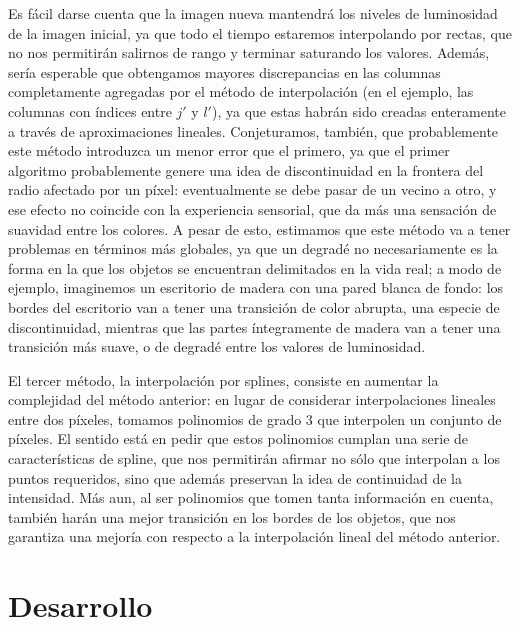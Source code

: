 \documentclass{article}
\begin{document}
Es fácil darse cuenta que la imagen nueva mantendrá los niveles de luminosidad de la imagen inicial, ya que todo el tiempo estaremos interpolando por rectas, que no nos permitirán salirnos de rango y terminar saturando los valores. Además, sería esperable que obtengamos mayores discrepancias en las columnas completamente agregadas por el método de interpolación (en el ejemplo, las columnas con índices entre $j'$ y $l'$), ya que estas habrán sido creadas enteramente a través de aproximaciones lineales. Conjeturamos, también, que probablemente este método introduzca un menor error que el primero, ya que el primer algoritmo probablemente genere una idea de discontinuidad en la frontera del radio afectado por un píxel: eventualmente se debe pasar de un vecino a otro, y ese efecto no coincide con la experiencia sensorial, que da más una sensación de suavidad entre los colores. A pesar de esto, estimamos que este método va a tener problemas en términos más globales, ya que un degradé no necesariamente es la forma en la que los objetos se encuentran delimitados en la vida real; a modo de ejemplo, imaginemos un escritorio de madera con una pared blanca de fondo: los bordes del escritorio van a tener una transición de color abrupta, una especie de discontinuidad, mientras que las partes íntegramente de madera van a tener una transición más suave, o de degradé entre los valores de luminosidad.

El tercer método, la interpolación por splines, consiste en aumentar la complejidad del método anterior: en lugar de considerar interpolaciones lineales entre dos píxeles, tomamos polinomios de grado 3 que interpolen un conjunto de píxeles. El sentido está en pedir que estos polinomios cumplan una serie de características de spline, que nos permitirán afirmar no sólo que interpolan a los puntos requeridos, sino que además preservan la idea de continuidad de la intensidad. Más aun, al ser polinomios que tomen tanta información en cuenta, también harán una mejor transición en los bordes de los objetos, que nos garantiza una mejoría con respecto a la interpolación lineal del método anterior.

\pagebreak

\section*{Desarrollo}{}
\end{document}
